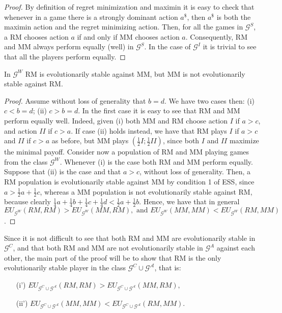 \documentclass[fleqn,reqno,11pt]{article}
\begin{document}
\begin{proof}
By definition of regret minimization and maximin it
is easy to check that whenever in a game there is a strongly dominant
action $a^{\$}$, then $a^{\$}$ is both the maximin action and the
regret minimizing action. Then, for all the games in $\mathcal{G}^{S}$,
a RM chooses action $a$ if and only if MM chooses action $a$. Consequently,
RM and MM always perform equally (well) in $\mathcal{G}^{S}$. In
the case of $\mathcal{G}^{I}$ it is trivial to see that all the players
perform equally.
\end{proof}

\medskip{}

\begin{lemma}
In $\mathcal{G}^{W}$ RM is evolutionarily stable
against MM, but MM is not evolutionarily stable against RM.
\end{lemma}

\begin{proof}
Assume without loss of generality that $b=d$. We have
two cases then: (i) $c<b=d$; (ii) $c>b=d$. In the first case it
is easy to see that RM and MM perform equally well. Indeed, given
(i) both MM and RM choose action $I$ if $a>c$, and action $II$
if $c>a$. If case (ii) holds instead, we have that RM plays $I$
if $a>c$ and $II$ if $c>a$ as before, but MM plays $(\frac{1}{2}I;\frac{1}{2}II)$,
since both $I$ and $II$ maximize the minimal payoff. Consider now
a population of RM and MM playing games from the class $\mathcal{G}^{W}$.
Whenever (i) is the case both RM and MM perform equally. Suppose that
(ii) is the case and that $a>c$, without loss of generality. Then,
a RM population is evolutionarily stable against MM by condition 1
of ESS, since $a>\frac{1}{2}a+\frac{1}{2}c$, whereas a MM population
is not evolutionarily stable against RM, because clearly $\frac{1}{4}a+\frac{1}{4}b+\frac{1}{4}c+\frac{1}{4}d<\frac{1}{2}a+\frac{1}{2}b$.
Hence, we have that in general $EU_{\mathcal{G}^{W}}(RM,RM)>EU_{\mathcal{G}^{W}}(MM,RM),\mbox{ and }EU_{\mathcal{G}^{W}}(MM,MM)<EU_{\mathcal{G}^{W}}(RM,MM)$.
\end{proof}

\medskip{}


Since it is not difficult to see that both RM and MM are evolutionarily
stable in $\mathcal{G}^{C}$, and that both RM and MM are not evolutionarily
stable in $\mathcal{G}^{A}$ against each other, the main part of
the proof will be to show that RM is the only evolutionarily stable
player in the class $\mathcal{G}^{C}\cup\mathcal{G^{A}}$, that is:
\begin{itemize}
\item[(i')] $EU_{\mathcal{G}^{C}\cup\mathcal{G^{A}}}(RM,RM)>EU_{\mathcal{G}^{C}\cup\mathcal{G^{A}}}(MM,RM),$
\item[(ii')] $EU_{\mathcal{G}^{C}\cup\mathcal{G^{A}}}(MM,MM)<EU_{\mathcal{G}^{C}\cup\mathcal{G^{A}}}(RM,MM).$
\end{itemize}
\end{document}

